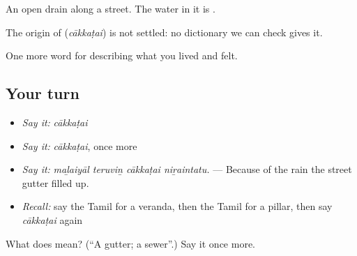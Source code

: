 An open drain along a street. The water in it is  .

\begin{cousinweb}
The origin of \textbf{} (\emph{cākkaṭai}) is not settled: no dictionary we can check gives it.
\end{cousinweb}

\begin{grammarlens}[title={What you've built}]
One more word for describing what you lived and felt.
\end{grammarlens}

\subsection*{Your turn}
\begin{itemize}
\raggedright
  \item \emph{Say it:} \emph{cākkaṭai}
  \item \emph{Say it:} \emph{cākkaṭai}, once more
  \item \emph{Say it:} \emph{maḻaiyāl teruviṉ cākkaṭai niṟaintatu.} — Because of the rain the street gutter filled up.
  \item \emph{Recall:} say the Tamil for a veranda, then the Tamil for a pillar, then say \emph{cākkaṭai} again
\end{itemize}

\begin{tcolorbox}[breakable,colback=teal!4,colframe=teal!35!black,title={Before you move on}]
What does  mean? (\textquotedblleft{}A gutter; a sewer\textquotedblright{}.) Say it once more.
\end{tcolorbox}
